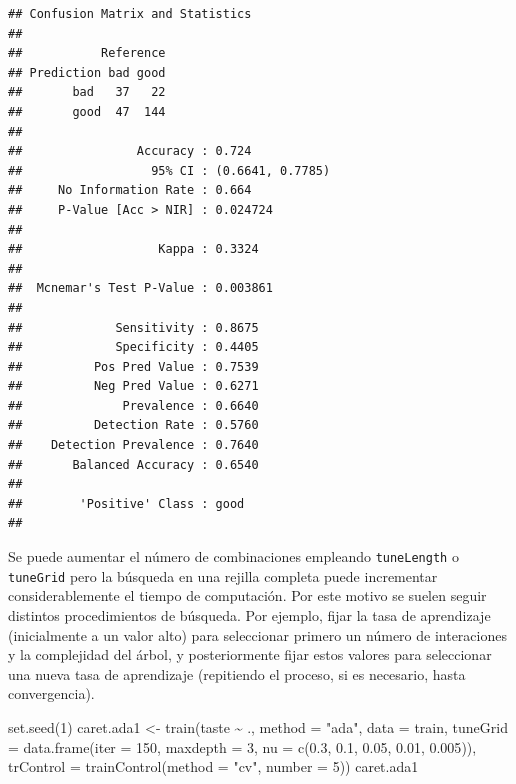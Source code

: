\documentclass[
  spanish,
]{book}
\newenvironment{Shaded}{\begin{snugshade}}{\end{snugshade}}
\newcommand{\AttributeTok}[1]{\textcolor[rgb]{0.77,0.63,0.00}{#1}}
\newcommand{\DecValTok}[1]{\textcolor[rgb]{0.00,0.00,0.81}{#1}}
\newcommand{\FloatTok}[1]{\textcolor[rgb]{0.00,0.00,0.81}{#1}}
\newcommand{\FunctionTok}[1]{\textcolor[rgb]{0.00,0.00,0.00}{#1}}
\newcommand{\NormalTok}[1]{#1}
\newcommand{\OtherTok}[1]{\textcolor[rgb]{0.56,0.35,0.01}{#1}}
\newcommand{\SpecialCharTok}[1]{\textcolor[rgb]{0.00,0.00,0.00}{#1}}
\newcommand{\StringTok}[1]{\textcolor[rgb]{0.31,0.60,0.02}{#1}}
\theoremstyle{break}
\theoremstyle{definition}
\theoremstyle{definition}
\theoremstyle{definition}
\theoremstyle{definition}
\theoremstyle{remark}
\begin{document}
\begin{verbatim}
## Confusion Matrix and Statistics
## 
##           Reference
## Prediction bad good
##       bad   37   22
##       good  47  144
##                                           
##                Accuracy : 0.724           
##                  95% CI : (0.6641, 0.7785)
##     No Information Rate : 0.664           
##     P-Value [Acc > NIR] : 0.024724        
##                                           
##                   Kappa : 0.3324          
##                                           
##  Mcnemar's Test P-Value : 0.003861        
##                                           
##             Sensitivity : 0.8675          
##             Specificity : 0.4405          
##          Pos Pred Value : 0.7539          
##          Neg Pred Value : 0.6271          
##              Prevalence : 0.6640          
##          Detection Rate : 0.5760          
##    Detection Prevalence : 0.7640          
##       Balanced Accuracy : 0.6540          
##                                           
##        'Positive' Class : good            
## 
\end{verbatim}

Se puede aumentar el número de combinaciones empleando \texttt{tuneLength} o \texttt{tuneGrid} pero la búsqueda en una rejilla completa puede incrementar considerablemente el tiempo de computación.
Por este motivo se suelen seguir distintos procedimientos de búsqueda. Por ejemplo, fijar la tasa de aprendizaje (inicialmente a un valor alto) para seleccionar primero un número de interaciones y la complejidad del árbol, y posteriormente fijar estos valores para seleccionar una nueva tasa de aprendizaje (repitiendo el proceso, si es necesario, hasta convergencia).

\begin{Shaded}
\begin{Highlighting}[]
\FunctionTok{set.seed}\NormalTok{(}\DecValTok{1}\NormalTok{)}
\NormalTok{caret.ada1 }\OtherTok{\textless{}{-}} \FunctionTok{train}\NormalTok{(taste }\SpecialCharTok{\textasciitilde{}}\NormalTok{ ., }\AttributeTok{method =} \StringTok{"ada"}\NormalTok{, }\AttributeTok{data =}\NormalTok{ train,}
                    \AttributeTok{tuneGrid =} \FunctionTok{data.frame}\NormalTok{(}\AttributeTok{iter =}  \DecValTok{150}\NormalTok{, }\AttributeTok{maxdepth =} \DecValTok{3}\NormalTok{,}
                                 \AttributeTok{nu =} \FunctionTok{c}\NormalTok{(}\FloatTok{0.3}\NormalTok{, }\FloatTok{0.1}\NormalTok{, }\FloatTok{0.05}\NormalTok{, }\FloatTok{0.01}\NormalTok{, }\FloatTok{0.005}\NormalTok{)),}
                   \AttributeTok{trControl =} \FunctionTok{trainControl}\NormalTok{(}\AttributeTok{method =} \StringTok{"cv"}\NormalTok{, }\AttributeTok{number =} \DecValTok{5}\NormalTok{))}
\NormalTok{caret.ada1}
\end{Highlighting}
\end{Shaded}
\end{document}
